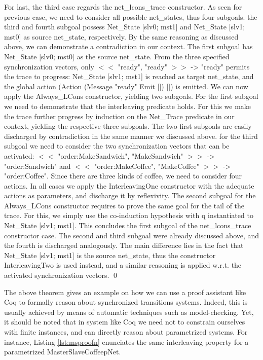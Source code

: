 \begin{theorem}
		For last, the third case regards the \textsf{net\_lcons\_trace} constructor. As seen for previous case,
		we need to consider all possible \textsf{net\_states}, thus four subgoals. the third and fourth subgoal
		possess \textsf{Net_State [slv0; mst1]} and \textsf{Net_State [slv1; mst0]}  
		as source \textsf{net\_state}, respectively. By the same reasoning as discussed above, we can demonstrate a contradiction
		in our context. The first subgoal has \textsf{Net_State [slv0; mst0]} as the source \textsf{net\_state}.
		From the three specified synchronization vectors, only 	\textsf{$<<$ "ready", "ready" $>>$ -> "ready"}
		permits the trace to progress: \textsf{Net_State [slv1; mst1]} is reached as target \textsf{net\_state},
		and the global \textsf{action} \textsf{(Action (Message "ready" Emit []) [])} is emitted. We can now apply
		the \textsf{Always\_LCons} constructor, yielding two subgoals. For the first subgoal we need to demonstrate
		that the \textsf{interleaving} predicate holds. For this we make the trace further progress by induction on the
		\textsf{Net\_Trace} predicate in our context, yielding the respective three subgoals. The two first subgoals
		are easily discharged by contradiction in the same manner we discussed above. for the third subgoal
		we need to consider the two synchronization vectors that can be activated: 
		\textsf{$<<$ "order:MakeSandwich", "MakeSandwich" $>>$ -> "order:Sandwich"} and
		\textsf{$<<$ "order:MakeCoffee", "MakeCoffee" $>>$ -> "order:Coffee"}. Since there are three kinds of
		coffee, we need to consider four \textsf{actions}. In all cases we apply the \textsf{InterleavingOne} constructor
		with the adequate \textsf{actions} as parameters, and discharge it by reflexivity. The second subgoal
		for the  \textsf{Always\_LCons} constructor requires to prove the same goal for the tail of the
		trace. For this, we simply use the co-induction hypothesis with \textsf{q} instantiated to
		\textsf{Net_State [slv1; mst1]}. This concludes the first subgoal of the \textsf{net\_lcons\_trace} 
		constructor case. The second and third subgoal were already discussed above, and the fourth is
		discharged analogously. The main difference lies in the fact that  \textsf{Net_State [slv1; mst1]}  
		is the source \textsf{net\_state}, thus the constructor \textsf{InterleavingTwo} is used instead,		
		and a similar reasoning is applied w.r.t. the activated synchronization
		vectors. \qed
\end{theorem}


	The above theorem gives an example on how we can use a proof assistant like Coq to formally reason about
	synchronized transitions systems. Indeed, this is usually achieved by means of automatic techniques such
	as model-checking. Yet, it should be noted that in system like Coq we need not to constrain ourselves
	with finite instances, and can directly reason about parametrized systems. 
	For instance, Listing \ref{lst:msproofn} enunciates the same interleaving property for a parametrized
	\textsf{MasterSlaveCoffeepNet}.

